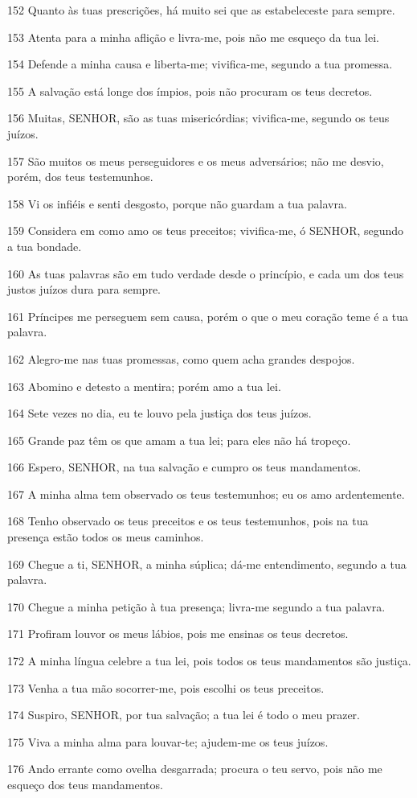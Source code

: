 \par 152 Quanto às tuas prescrições, há muito sei que as estabeleceste para sempre.
\par 153 Atenta para a minha aflição e livra-me, pois não me esqueço da tua lei.
\par 154 Defende a minha causa e liberta-me; vivifica-me, segundo a tua promessa.
\par 155 A salvação está longe dos ímpios, pois não procuram os teus decretos.
\par 156 Muitas, SENHOR, são as tuas misericórdias; vivifica-me, segundo os teus juízos.
\par 157 São muitos os meus perseguidores e os meus adversários; não me desvio, porém, dos teus testemunhos.
\par 158 Vi os infiéis e senti desgosto, porque não guardam a tua palavra.
\par 159 Considera em como amo os teus preceitos; vivifica-me, ó SENHOR, segundo a tua bondade.
\par 160 As tuas palavras são em tudo verdade desde o princípio, e cada um dos teus justos juízos dura para sempre.
\par 161 Príncipes me perseguem sem causa, porém o que o meu coração teme é a tua palavra.
\par 162 Alegro-me nas tuas promessas, como quem acha grandes despojos.
\par 163 Abomino e detesto a mentira; porém amo a tua lei.
\par 164 Sete vezes no dia, eu te louvo pela justiça dos teus juízos.
\par 165 Grande paz têm os que amam a tua lei; para eles não há tropeço.
\par 166 Espero, SENHOR, na tua salvação e cumpro os teus mandamentos.
\par 167 A minha alma tem observado os teus testemunhos; eu os amo ardentemente.
\par 168 Tenho observado os teus preceitos e os teus testemunhos, pois na tua presença estão todos os meus caminhos.
\par 169 Chegue a ti, SENHOR, a minha súplica; dá-me entendimento, segundo a tua palavra.
\par 170 Chegue a minha petição à tua presença; livra-me segundo a tua palavra.
\par 171 Profiram louvor os meus lábios, pois me ensinas os teus decretos.
\par 172 A minha língua celebre a tua lei, pois todos os teus mandamentos são justiça.
\par 173 Venha a tua mão socorrer-me, pois escolhi os teus preceitos.
\par 174 Suspiro, SENHOR, por tua salvação; a tua lei é todo o meu prazer.
\par 175 Viva a minha alma para louvar-te; ajudem-me os teus juízos.
\par 176 Ando errante como ovelha desgarrada; procura o teu servo, pois não me esqueço dos teus mandamentos.

